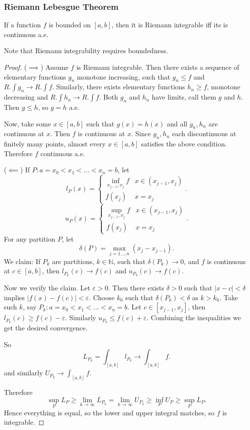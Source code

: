 
\subsubsection{Riemann Lebesgue Theorem}



\begin{theorem}
	If a function $f$ is bounded on $[a,b]$, then it is Riemann integrable iff its is continuous a.e.
\end{theorem}
Note that Riemann integrability requires boundedness.
\begin{proof}
	($\implies$) Assume $f$ is Riemann integrable. Then there exists a sequence of elementary functions $g_n$ monotone increasing, such that $g_n \le  f$ and 
$R.\int g_n \to R. \int f$. Similarly, there exists elementary functions $h_n \ge f$, monotone decreasing and $R.\int  h_n \to R. \int f$. Both $g_n$ and $h_n$ have limits, call them $g$ and $h$. Then $g \le h$, so $g = h$ a.e. 

Now, take some $x \in [a,b]$ such that $g(x) = h(x) $ and all $g_n, h_n$ are continuous at $x$. Then $f$ is continuous at $x$. Since $g_n, h_n$ each discontinuous at finitely many points, almost every $x \in [a,b]$ satisfies the above condition. Therefore $f$ continuous a.e.

	($\impliedby$) If $P: a = x_0 < x_1 < \ldots < x_n = b$, let
	\[
		l_P(x) = \begin{cases}
			\inf_{x_{j-1}, x_j} f & x \in (x_{j-1}, x_j)\\
			f(x_j) & x = x_j
		\end{cases}
	.\] 
\[
		u_P(x) = \begin{cases}
			\sup_{x_{j-1}, x_j} f & x \in (x_{j-1}, x_j)\\
			f(x_j) & x = x_j
		\end{cases}
	.\]
	For any partition $P$, let
	\[
		\delta(P) = \max_{j = 1\ldots, n} (x_j - x_{j-1})
	.\] 
	We claim: If $P_k$ are partitions, $k \in \mathbb{N}$, such that $\delta(P_k) \to 0$, and $f$ is continuous at $c \in [a,b]$, then $l_{P_k}(c) \to  f(c)$ and $u_{P_k}(c) \to f(c)$.

	Now we verify the claim. Let $\varepsilon>0$. Then there exists $\delta>0$ such that $\left| x - c \right| < \delta$ implies $\left| f(x) - f(c) \right| <\varepsilon$. Choose $k_0$ such that $\delta(P_k) < \delta$ as $k > k_0$. Take such $k$, say $P_k: a = x_0 < x_1 < \ldots < x_n = b$. Let $c \in [x_{j-1}, x_j]$, then $l_{P_k}(c) \ge f(c) - \varepsilon$. Similarly $u_{P_k} \le f(c) +\varepsilon$. Combining the inequalities we get the desired convergence. 

	So
	\[
		L_{P_k} = \int _{[a,b]} l_{P_k} \to \int _{[a,b]} f
	.\] 
	and similarly $U_{P_k} \to  \int _{[a,b]}f$.

	Therefore
	\[
		\sup_P L_P \ge \lim_{k \to \infty }L_{P_k} = \lim_{k \to  \infty } U_{P_k} \ge \inf_P U_P \ge \sup _P L_P
	.\] 
	Hence everything is equal, so the lower and upper integral matches, so $f$ is integrable.
\end{proof}

